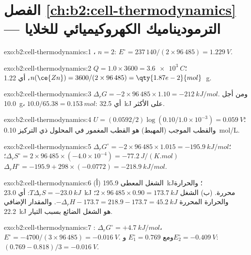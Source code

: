 \section*{الفصل \ref{ch:b2:cell-thermodynamics} --- الترموديناميك الكهروكيميائي للخلايا}

\begin{solution}{exo:b2:cell-thermodynamics:1}
، $n = 2$: $E^\circ = 237\,140/(2 \times 96\,485) =
\qty{1.229}{V}$.
\end{solution}

\begin{solution}{exo:b2:cell-thermodynamics:2}
$Q = 1.0 \times 3600 = \qty{3.6e3}{C}$؛ $n(\ce{Zn}) = 3600/(2 \times 96\,485) =
\qty{1.87e-2}{mol}$، أي \qty{1.22}{g}.
\end{solution}

\begin{solution}{exo:b2:cell-thermodynamics:3}
$\Delta_r G = -2 \times 96\,485 \times 1.10 = \qty{-212}{kJ/mol}$. ومن أجل
\qty{10.0}{g}، $10.0/65.38 = \qty{0.153}{mol}$: أي \qty{32.5}{kJ} على الأكثر.
\end{solution}

\begin{solution}{exo:b2:cell-thermodynamics:4}
$U = (0.0592/2)\log(0.10/1.0 \times 10^{-3}) = \qty{0.059}{V}$؛ والقطب الموجب
(المهبط) هو القطب المغمور في المحلول ذي التركيز \qty{0.10}{mol/L}.
\end{solution}

\begin{solution}{exo:b2:cell-thermodynamics:5}
$\Delta_r G^\circ = -2 \times 96\,485 \times 1.015 = \qty{-195.9}{kJ/mol}$؛
$\Delta_r S^\circ = 2 \times 96\,485 \times (-4.0 \times 10^{-4}) =
\qty{-77.2}{J/(K.mol)}$؛ $\Delta_r H^\circ = -195.9 + 298 \times (-0.0772) =
\qty{-218.9}{kJ/mol}$.
\end{solution}

\begin{solution}{exo:b2:cell-thermodynamics:6}
(أ) الشغل المعطى \qty{195.9}{kJ}؛ والحرارة $T\Delta_r S = \qty{-23.0}{kJ}$: أي \qty{23.0}{kJ}
محررة. (ب) الشغل $2 \times 96\,485 \times 0.90 = \qty{173.7}{kJ}$؛ والحرارة المحررة
$-\Delta_r H - 173.7 = 218.9 - 173.7 = \qty{45.2}{kJ}$. والمقدار الإضافي
\qty{22.2}{kJ} هو الشغل الضائع بسبب التيار.
\end{solution}

\begin{solution}{exo:b2:cell-thermodynamics:7}
: $\Delta_r G^\circ = +\qty{4.7}{kJ/mol}$، $E^\circ =
-4700/(3 \times 96\,485) = \qty{-0.016}{V}$. ومع $E_1^\circ = 0.769$ 
و$E_2^\circ = \qty{-0.409}{V}$: $(0.769 - 0.818)/3 = \qty{-0.016}{V}$.
\end{solution}

